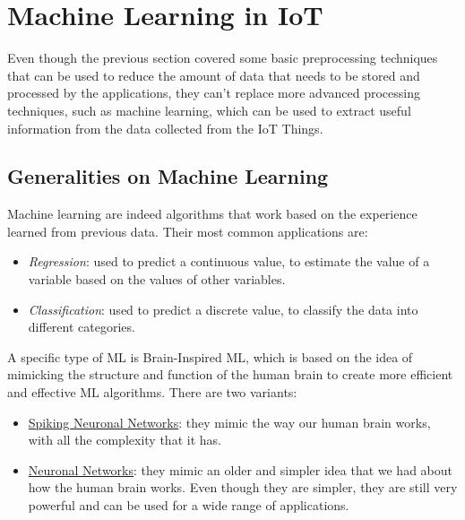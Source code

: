 \section{Machine Learning in IoT}

Even though the previous section covered some basic preprocessing techniques that can be used to reduce the amount of data that needs to be stored and processed by the applications, they can't replace more advanced processing techniques, such as machine learning, which can be used to extract useful information from the data collected from the IoT Things.

\subsection{Generalities on Machine Learning}
Machine learning are indeed algorithms that work based on the experience learned from previous data. Their most common applications are:
\begin{itemize}
    \item \emph{Regression}: used to predict a continuous value, to estimate the value of a variable based on the values of other variables.
    \item \emph{Classification}: used to predict a discrete value, to classify the data into different categories.
\end{itemize}

A specific type of ML is Brain-Inspired ML, which is based on the idea of mimicking the structure and function of the human brain to create more efficient and effective ML algorithms. There are two variants:
\begin{itemize}
    \item \ul{Spiking Neuronal Networks}: they mimic the way our human brain works, with all the complexity that it has.
    \item \ul{Neuronal Networks}: they mimic an older and simpler idea that we had about how the human brain works. Even though they are simpler, they are still very powerful and can be used for a wide range of applications.
\end{itemize}

